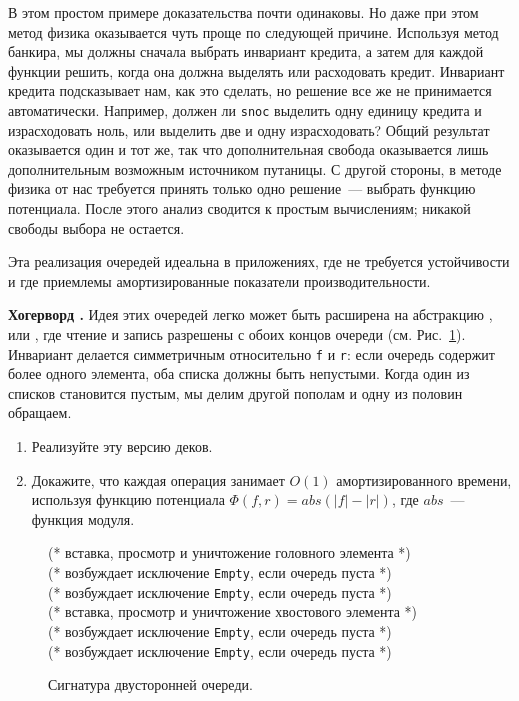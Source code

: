 В этом простом примере доказательства почти одинаковы. Но даже при
этом метод физика оказывается чуть проще по следующей причине.
Используя метод банкира, мы должны сначала выбрать инвариант кредита,
а затем для каждой функции решить, когда она должна выделять или
расходовать кредит. Инвариант кредита подсказывает нам, как это
сделать, но решение все же не принимается автоматически. Например,
должен ли \lstinline!snoc! выделить одну единицу кредита и израсходовать
ноль, или выделить две и одну израсходовать? Общий результат
оказывается один и тот же, так что дополнительная свобода оказывается
лишь дополнительным возможным источником путаницы. С другой стороны, в
методе физика от нас требуется принять только одно решение~--- выбрать
функцию потенциала. После этого анализ сводится к простым вычислениям;
никакой свободы выбора не остается.

\begin{hint}
  Эта реализация очередей идеальна в приложениях, где не требуется
  устойчивости и где приемлемы амортизированные показатели
  производительности.
\end{hint}

\begin{exercise}\label{ex:5.1}
  \textbf{Хогерворд \cite{Hoogerwoord1992}.}  Идея этих очередей легко
  может быть расширена на абстракцию , или , где чтение и запись разрешены с
  обоих концов очереди (см. Рис.~\ref{fig:5.3}). Инвариант делается
  симметричным относительно \lstinline!f! и \lstinline!r!: если
  очередь содержит более одного элемента, оба списка должны быть
  непустыми. Когда один из списков становится пустым, мы делим другой
  пополам и одну из половин обращаем.

  \begin{enumerate}
  \item Реализуйте эту версию деков.
  \item Докажите, что каждая операция занимает $O(1)$ амортизированного
    времени, используя функцию потенциала $\Phi(f,r) = abs(|f| -
    |r|)$, где $abs$~--- функция модуля.
  \end{enumerate}
\end{exercise}

\begin{figure}
  \centering

  (* вставка, просмотр и уничтожение головного элемента *)\\
  (* возбуждает исключение \lstinline!Empty!, если очередь пуста *)\\
  (* возбуждает исключение \lstinline!Empty!, если очередь пуста *)\\

  (* вставка, просмотр и уничтожение хвостового элемента *)\\
  (* возбуждает исключение \lstinline!Empty!, если очередь пуста *)\\
  (* возбуждает исключение \lstinline!Empty!, если очередь пуста *)\\

  \caption{Сигнатура двусторонней очереди.}
  \label{fig:5.3}
\end{figure}

